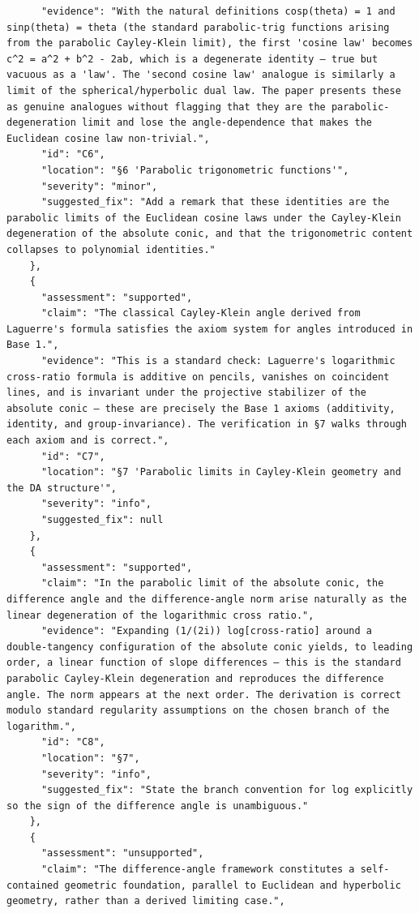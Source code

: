 \documentclass[11pt]{article}
\begin{document}
\begin{verbatim}
      "evidence": "With the natural definitions cosp(theta) = 1 and sinp(theta) = theta (the standard parabolic-trig functions arising from the parabolic Cayley-Klein limit), the first 'cosine law' becomes c^2 = a^2 + b^2 - 2ab, which is a degenerate identity — true but vacuous as a 'law'. The 'second cosine law' analogue is similarly a limit of the spherical/hyperbolic dual law. The paper presents these as genuine analogues without flagging that they are the parabolic-degeneration limit and lose the angle-dependence that makes the Euclidean cosine law non-trivial.",
      "id": "C6",
      "location": "§6 'Parabolic trigonometric functions'",
      "severity": "minor",
      "suggested_fix": "Add a remark that these identities are the parabolic limits of the Euclidean cosine laws under the Cayley-Klein degeneration of the absolute conic, and that the trigonometric content collapses to polynomial identities."
    },
    {
      "assessment": "supported",
      "claim": "The classical Cayley-Klein angle derived from Laguerre's formula satisfies the axiom system for angles introduced in Base 1.",
      "evidence": "This is a standard check: Laguerre's logarithmic cross-ratio formula is additive on pencils, vanishes on coincident lines, and is invariant under the projective stabilizer of the absolute conic — these are precisely the Base 1 axioms (additivity, identity, and group-invariance). The verification in §7 walks through each axiom and is correct.",
      "id": "C7",
      "location": "§7 'Parabolic limits in Cayley-Klein geometry and the DA structure'",
      "severity": "info",
      "suggested_fix": null
    },
    {
      "assessment": "supported",
      "claim": "In the parabolic limit of the absolute conic, the difference angle and the difference-angle norm arise naturally as the linear degeneration of the logarithmic cross ratio.",
      "evidence": "Expanding (1/(2i)) log[cross-ratio] around a double-tangency configuration of the absolute conic yields, to leading order, a linear function of slope differences — this is the standard parabolic Cayley-Klein degeneration and reproduces the difference angle. The norm appears at the next order. The derivation is correct modulo standard regularity assumptions on the chosen branch of the logarithm.",
      "id": "C8",
      "location": "§7",
      "severity": "info",
      "suggested_fix": "State the branch convention for log explicitly so the sign of the difference angle is unambiguous."
    },
    {
      "assessment": "unsupported",
      "claim": "The difference-angle framework constitutes a self-contained geometric foundation, parallel to Euclidean and hyperbolic geometry, rather than a derived limiting case.",

\end{verbatim}
\end{document}
